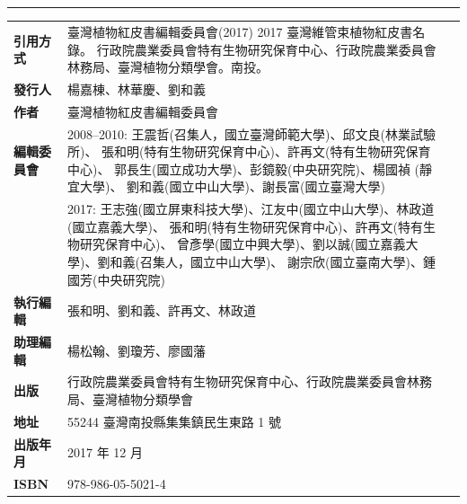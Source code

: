 \clearpage
\pagestyle{plain}
\thispagestyle{empty}
\linespread{1.5}
\noindent\huge \color{red}{2017 臺灣維管束植物紅皮書名錄} \\
\noindent\Large \color{red}{The Red List of Vascular Plants of Taiwan, 2017} \\
\normalsize
\hrule
\color{black}
\begin{table}[H]
  \scriptsize
  {\renewcommand\arraystretch{1.2}
  \begin{tabular}{>{\raggedleft\arraybackslash}p{2.5cm}p{9cm}p{3cm}}
      \textbf{引用方式}          & 臺灣植物紅皮書編輯委員會(2017) 
                                        2017 臺灣維管束植物紅皮書名錄。
                                        行政院農業委員會特有生物研究保育中心、行政院農業委員會林務局、臺灣植物分類學會。南投。 & \\
      \textbf{發行人}                 & 楊嘉棟、林華慶、劉和義  & \\
      \textbf{作者}                   & 臺灣植物紅皮書編輯委員會  & \\
      \textbf{編輯委員會}             & 2008--2010: 王震哲(召集人，國立臺灣師範大學)、邱文良(林業試驗所)、
                                        張和明(特有生物研究保育中心)、許再文(特有生物研究保育中心)、
                                        郭長生(國立成功大學)、彭鏡毅(中央研究院)、楊國禎 (靜宜大學)、
                                        劉和義(國立中山大學)、謝長富(國立臺灣大學)  & \\
                                      & 2017: 王志強(國立屏東科技大學)、江友中(國立中山大學)、林政道(國立嘉義大學)、
                                        張和明(特有生物研究保育中心)、許再文(特有生物研究保育中心)、
                                        曾彥學(國立中興大學)、劉以誠(國立嘉義大學)、劉和義(召集人，國立中山大學)、
                                        謝宗欣(國立臺南大學)、鍾國芳(中央研究院)  & \\
      \textbf{執行編輯}          & 張和明、劉和義、許再文、林政道  & \\
      \textbf{助理編輯}          & 楊松翰、劉瓊芳、廖國藩  & \\
      \textbf{出版}              & 行政院農業委員會特有生物研究保育中心、行政院農業委員會林務局、臺灣植物分類學會  & \\
      \textbf{地址}              & 55244 臺灣南投縣集集鎮民生東路 1 號  & \\
      \textbf{出版年月}          & 2017 年 12 月  & \\
      \textbf{ISBN}              & 978-986-05-5021-4  & \\

\end{tabular}}
\end{table}
